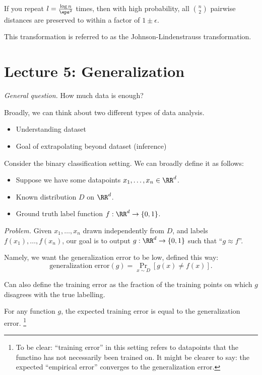 \begin{fact}
  If you repeat $l = \frac{\log n}{\eps^2}$ times, then with high probability, all $\binom{n}{2}$ pairwise distances are preserved to within a factor of $1 \pm \epsilon$.
\end{fact}

This transformation is referred to as the Johnson-Lindenstrauss transformation.


\section{Lecture 5: Generalization}

{\it General question.} How much data is enough?

Broadly, we can think about two different types of data analysis.

\begin{itemize}
  \item Understanding dataset
  \item Goal of extrapolating beyond dataset (inference)
\end{itemize}

Consider the binary classification setting.  We can broadly define it as follows:

\begin{itemize}
  \item Suppose we have some datapoints $x_1, \dots, x_n \in \RR^d$.
  \item Known distribution $D$ on $\RR^d$.
  \item Ground truth label function $f: \RR^d \to \left\{ 0, 1 \right\}$.
\end{itemize}

{\it Problem.} Given $x_1, \dots, x_n$ drawn independently from $D$, and labels $f(x_1), \dots, f(x_n)$, our goal is to output $g: \RR^d \to \left\{ 0, 1 \right\}$ such that ``$g \approx f$''.

Namely, we want the generalization error to be low, defined this way:
\[
  \text{generalization error}(g) = \Pr_{x \sim D} \left[ g(x) \neq f(x) \right].
\]

Can also define the training error as the fraction of the training points on which $g$ disagrees with the true labelling. \\

\begin{claim}
  For any function $g$, the expected training error is equal to the generalization error.  \footnote{To be clear: ``training error'' in this setting refers to datapoints that the functino has not necessarily been trained on.  It might be clearer to say: the expected ``empirical error'' converges to the generalization error.}
\end{claim}

